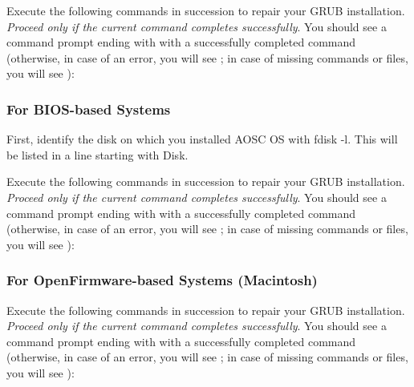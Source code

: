 

    Execute the following commands in succession to repair your GRUB installation.
    \textit{Proceed only if the current command completes successfully}.
    You should see a command prompt ending with \icode{\#} with a successfully completed command
    (otherwise, in case of an error, you will see \icode{!}; in case of missing commands or files, you will see ):


    \subsubsection*{For BIOS-based Systems}

    First, identify the disk on which you installed AOSC OS with fdisk -l. This will be listed in a line starting with Disk.

    Execute the following commands in succession to repair your GRUB installation.
    \textit{Proceed only if the current command completes successfully}.
    You should see a command prompt ending with \icode{\#} with a successfully completed command
    (otherwise, in case of an error, you will see \icode{!}; in case of missing commands or files, you will see ):



    \subsubsection*{For OpenFirmware-based Systems (Macintosh)}

    Execute the following commands in succession to repair your GRUB installation.
    \textit{Proceed only if the current command completes successfully}.
    You should see a command prompt ending with \icode{\#} with a successfully completed command
    (otherwise, in case of an error, you will see \icode{!}; in case of missing commands or files, you will see ):


